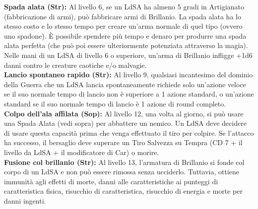 \documentclass[a4paper]{report}
\begin{document}
\begin{multicols}{2}
\textbf{Spada alata (Str):} Al livello 6, se un LdSA ha almeno 5 gradi in Artigianato (fabbricazione di armi), può fabbricare armi di Brillanio. La spada alata ha lo stesso costo e lo stesso tempo per creare un'arma normale di quel tipo (ovvero uno spadone). È possibile spendere più tempo e denaro per produrre una spada alata perfetta (che può poi essere ulteriormente potenziata attraverso la magia). Nelle mani di un LdSA di livello 6 o superiore, un'arma di Brillanio infligge +1d6 danni contro le creature caotiche e/o malvagie.\\

\textbf{Lancio spontaneo rapido (Str):} Al livello 9, qualsiasi incantesimo del dominio della Guerra che un LdSA lancia spontaneamente richiede solo un'azione veloce se il suo normale tempo di lancio non è superiore a 1 azione standard, o un'azione standard se il suo normale tempo di lancio è 1 azione di round completo.\\

\textbf{Colpo dell'ala affilata (Sop):} Al livello 12, una volta al giorno, si può usare una Spada Alata (vedi sopra) per abbattere un nemico. Un LdSA deve decidere di usare questa capacità prima che venga effettuato il tiro per colpire. Se l'attacco ha successo, il bersaglio deve superare un Tiro Salvezza su Tempra (CD 7 + il livello da LdSA + il modificatore di Car) o morire.\\

\textbf{Fusione col brillanio (Str):} Al livello 13, l’armatura di Brillanio si fonde col corpo di un LdSA e non può essere rimossa senza ucciderlo. Tuttavia, ottiene immunità agli effetti di morte, danni alle caratteristiche ai punteggi di caratteristica fisica, risucchio di caratteristica, risucchio di energia e morte per danni ingenti.
\end{multicols}
\end{document}
